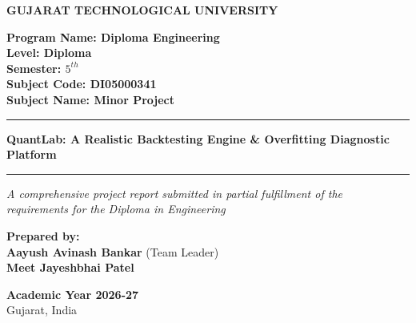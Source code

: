 \documentclass[12pt,a4paper,oneside]{report}
\begin{document}
\begin{titlepage}
    \begin{center}
        \vspace*{0.5cm}
        
        \Huge
        \textbf{\textcolor{gtured}{GUJARAT TECHNOLOGICAL UNIVERSITY}}
        
        \vspace{1cm}
        
        \LARGE
        \textbf{Program Name: Diploma Engineering} \\
        \textbf{Level: Diploma} \\
        \textbf{Semester: $5^{th}$} \\
        \textbf{Subject Code: DI05000341} \\
        \textbf{Subject Name: Minor Project}
        
        \vspace{1.5cm}
        \rule{\textwidth}{1pt}
        \vspace{0.5cm}
        
        \Huge
        \textbf{\textcolor{gtublue}{QuantLab: A Realistic Backtesting Engine \& Overfitting Diagnostic Platform}}
        
        \vspace{0.5cm}
        \rule{\textwidth}{1pt}
        \vspace{1.5cm}
        
        \Large
        \textit{A comprehensive project report submitted in partial fulfillment of the \\ requirements for the Diploma in Engineering}
        
        \vspace{2cm}
        
        \textbf{Prepared by:} \\
        \vspace{0.5cm}
        \Large
        \textbf{Aayush Avinash Bankar} (Team Leader) \\
        \textbf{Meet Jayeshbhai Patel}
        
        \vfill
        
        \Large
        \textbf{Academic Year 2026-27} \\
        \normalsize
        Gujarat, India
        
    \end{center}
\end{titlepage}
\end{document}
